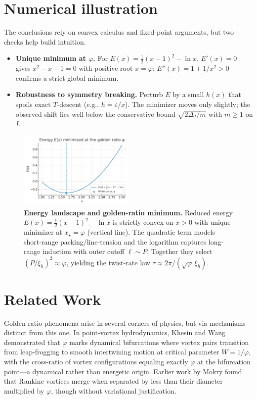 \documentclass[11pt]{article}
\theoremstyle{remark}
\theoremstyle{definition}
\newcommand{\ph}{\varphi}
\newcommand{\eps}{\varepsilon}
\begin{document}
\section{Numerical illustration}
The conclusions rely on convex calculus and fixed-point arguments, but two checks help build intuition.
\begin{itemize}[leftmargin=1.15em]
  \item \textbf{Unique minimum at $\ph$.} For $E(x)=\tfrac12(x-1)^2-\ln x$, $E'(x)=0$ gives $x^2-x-1=0$ with positive root $x=\ph$; $E''(x)=1+1/x^2>0$ confirms a strict global minimum.
  \item \textbf{Robustness to symmetry breaking.} Perturb $E$ by a small $h(x)$ that spoils exact $T$-descent (e.g., $h=\eps/x$). The minimizer moves only slightly; the observed shift lies well below the conservative bound $\sqrt{2\Delta_I/m}$ with $m\ge1$ on $I$.
\end{itemize}

\begin{figure}[t]
  \centering
  \includegraphics[width=0.5\textwidth]{E_of_x_min_at_phi.pdf}
  \caption{\textbf{Energy landscape and golden-ratio minimum.}
    Reduced energy $E(x)=\tfrac12(x-1)^2-\ln x$ is strictly convex on $x>0$ with unique minimizer at $x_\star=\varphi$ (vertical line). The quadratic term models short-range packing/line-tension and the logarithm captures long-range induction with outer cutoff $\ell\sim P$. Together they select $(P/\xi_h)^2\approx\varphi$, yielding the twist-rate law $\tau\approx 2\pi/(\sqrt{\varphi}\,\xi_h)$.}
  \label{fig:energy-min}
\end{figure}

\FloatBarrier

\section{Related Work}
Golden-ratio phenomena arise in several corners of physics, but via mechanisms distinct from this one. In point-vortex hydrodynamics, Khesin and Wang \cite{khesin2021} demonstrated that $\ph$ marks dynamical bifurcations where vortex pairs transition from leap-frogging to smooth intertwining motion at critical parameter $W=1/\ph$, with the cross-ratio of vortex configurations equaling exactly $\ph$ at the bifurcation point---a dynamical rather than energetic origin. Earlier work by Mokry \cite{mokry2008} found that Rankine vortices merge when separated by less than their diameter multiplied by $\ph$, though without variational justification.
\end{document}
